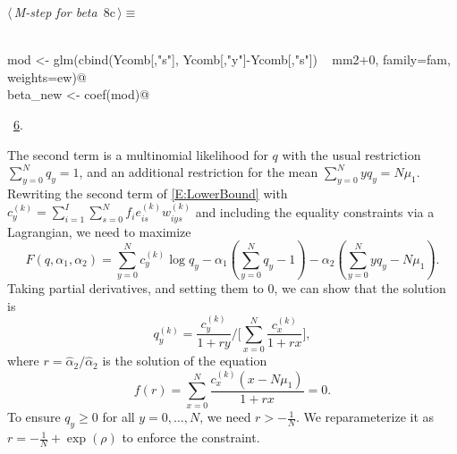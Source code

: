 \documentclass[reqno]{amsart}
\renewcommand{\NWtarget}[2]{\hypertarget{#1}{#2}}
\renewcommand{\NWlink}[2]{\hyperlink{#1}{#2}}
\begin{document}
\begin{flushleft} \small\label{scrap11}\raggedright\small
\NWtarget{nuweb8c}{} $\langle\,${\itshape M-step for beta}\nobreak\ {\footnotesize {8c}}$\,\rangle\equiv$
\vspace{-1ex}
\begin{list}{}{} \item
\mbox{}\verb@@\\
\mbox{}\verb@    mod <- glm(cbind(Ycomb[,"s"], Ycomb[,"y"]-Ycomb[,"s"]) ~ mm2+0, family=fam, weights=ew)@\\
\mbox{}\verb@    beta_new <- coef(mod)@\\
\mbox{}\verb@@{\NWsep}
\end{list}
\vspace{-1.5ex}
\footnotesize
\begin{list}{}{\setlength{\itemsep}{-\parsep}\setlength{\itemindent}{-\leftmargin}}
\item \NWtxtMacroRefIn\ \NWlink{nuweb6}{6}.

\item{}
\end{list}
\vspace{4ex}
\end{flushleft}
The second term is a multinomial likelihood for $q$ with the usual restriction  $\sum_{y=0}^N q_y=1$, and an additional restriction for the mean $\sum_{y=0}^{N}yq_y=N \mu_1$. Rewriting the second term of \eqref{E:LowerBound} with $c^{(k)}_y = \sum_{i=1}^I \sum_{s=0}^N f_i e_{is}^{(k)} w_{iys}^{(k)}$ and including the equality constraints via a Lagrangian, we need to maximize
\begin{equation*}
  F(q,\alpha_1,\alpha_2) = \sum_{y=0}^{N}c^{(k)}_y\log q_y - \alpha_1 (\sum_{y=0}^{N}q_y - 1) - \alpha_2 (\sum_{y=0}^{N}yq_y - N\mu_1).
\end{equation*}
Taking partial derivatives, and setting them to 0, we can show that the solution is
\begin{equation}\label{E:q_update}
  q^{(k)}_y = \frac{c^{(k)}_y}{1+r y} \Big/ \Big[ \sum_{x=0}^{N}\frac{c^{(k)}_x}{1+r x}\Big],
\end{equation}
where $r=\hat\alpha_2 / \hat\alpha_2$ is the solution of the equation
\begin{equation}\label{E:r_equation}
   f(r) = \sum_{x=0}^{N}\frac{c^{(k)}_x (x - N\mu_1)}{1+r x} = 0.
\end{equation}
To ensure $q_y\geq 0$ for all $y=0,\ldots,N$, we need $r> -\frac 1N$. We reparameterize it as $r=-\frac 1N+\exp(\rho)$ to enforce the constraint.
\end{document}
